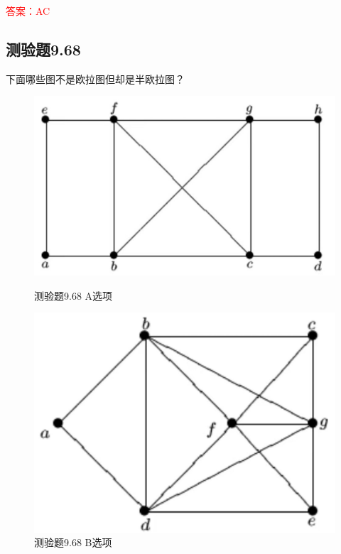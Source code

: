 \documentclass[UTF8, heading=true]{ctexart}
\begin{document}
\textcolor{red}{答案：AC}

\subsection{测验题9.68}

下面哪些图不是欧拉图但却是半欧拉图？

\begin{figure}[H]
  \centering
  \begin{minipage}[t]{0.35\textwidth}
      \centering
      \includegraphics[width=1\textwidth]{9.67_1.jpg} %
      \vspace{-0.3cm}
      \caption{测验题9.68 A选项}
  \end{minipage}
  \hspace{0.1\textwidth} %
  \begin{minipage}[t]{0.35\textwidth}
      \centering
      \includegraphics[width=1\textwidth]{9.67_2.jpg} %
      \vspace{-0.3cm}
      \caption{测验题9.68 B选项}
\end{minipage}
\end{figure}
\end{document}
